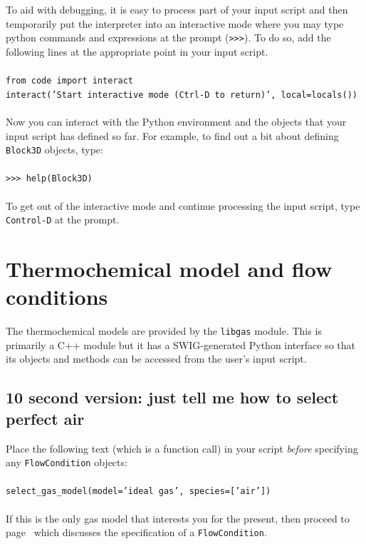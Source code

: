 \clearpage

\medskip
To aid with debugging, it is easy to process part of your input script and
then temporarily put the interpreter into an interactive mode where 
you may type python commands and expressions at the prompt (\texttt{>>>}).
To do so, add the following lines at the appropriate point in your input
script.\\
%
\topbar\\
\texttt{from code import interact}\\
\texttt{interact('Start interactive mode (Ctrl-D to return)', local=locals())}\\
\bottombar\\
%
Now you can interact with the Python environment and the objects that your
input script has defined so far.
For example, to find out a bit about defining \texttt{Block3D} objects, type:\\
%
\topbar\\
\texttt{>>> help(Block3D)}\\
\bottombar\\
%
To get out of the interactive mode and continue processing the input script,
type \texttt{Control-D} at the prompt.


\section{Thermochemical model and flow conditions}
\label{thermo-flow-sec}
%
The thermochemical models are provided by the \texttt{libgas} module.
This is primarily a C++ module but it has a SWIG-generated Python interface so
that its objects and methods can be accessed from the user's input script.

\subsection{10 second version: just tell me how to select perfect air}
Place the following text (which is a function call) in your script \emph{before}
specifying any \texttt{FlowCondition} objects:\\
%
\topbar\\
\texttt{select\_gas\_model(model='ideal gas', species=['air'])}\\ 
\bottombar\\
%
If this is the only gas model that interests you for the present, then
proceed to page~\pageref{sec:flow_condition} which discusses the specification
of a \texttt{FlowCondition}.

